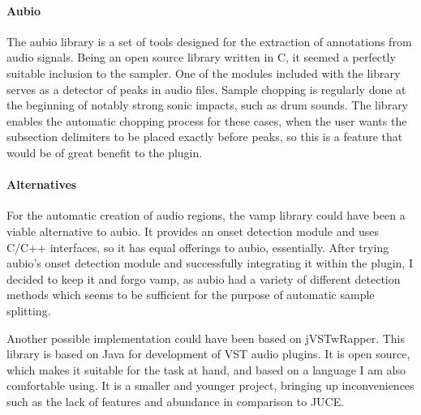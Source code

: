 \documentclass[12pt, a4paper, hidelinks]{article}
\begin{document}
	
	\paragraph{Aubio\\}
	The aubio library is a set of tools designed for the extraction of annotations from audio signals\cite{aubio}. Being an open source library written in C, it seemed a perfectly suitable inclusion to the sampler. One of the modules included with the library serves as a detector of peaks in audio files. Sample chopping is regularly done at the beginning of notably strong sonic impacts, such as drum sounds. The library enables the automatic chopping process for these cases, when the user wants the subsection delimiters to be placed exactly before peaks, so this is a feature that would be of great benefit to the plugin.
	
	\paragraph{Alternatives\\}
	For the automatic creation of audio regions, the vamp\cite{vamp} library could have been a viable alternative to aubio\cite{aubio}. It provides an onset detection module\cite{vamponset} and uses C/C++ interfaces, so it has equal offerings to aubio, essentially. After trying aubio's onset detection module and successfully integrating it within the plugin, I decided to keep it and forgo vamp, as aubio had a variety of different detection methods which seems to be sufficient for the purpose of automatic sample splitting.\par	
	Another possible implementation could have been based on jVSTwRapper\cite{jVSTwRapper}. This library is based on Java for development of VST audio plugins. It is open source, which makes it suitable for the task at hand, and based on a language I am also comfortable using. It is a smaller and younger project, bringing up inconveniences such as the lack of features and abundance in comparison to JUCE. 
	
	
	\newpage	
\end{document}
